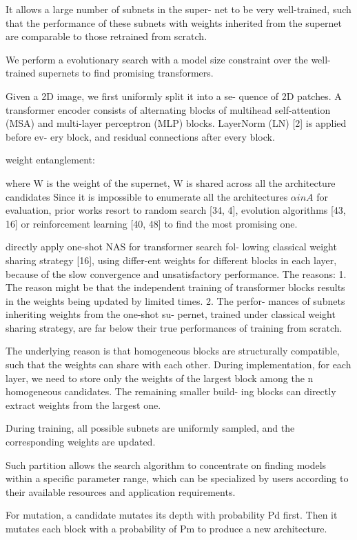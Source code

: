 \documentclass[UTF8]{article}
\begin{document}
It allows a large number of subnets in the super- net to be very well-trained, such that the performance of these subnets with weights inherited from the supernet are comparable to those retrained from scratch.

We perform a evolutionary search with a model size constraint over the well-trained supernets to find promising transformers.

Given a 2D image, we first uniformly split it into a se- quence of 2D patches. A transformer encoder consists of alternating blocks of multihead self-attention (MSA) and multi-layer perceptron (MLP) blocks. LayerNorm (LN) [2] is applied before ev- ery block, and residual connections after every block.

weight entanglement:

where W is the weight of the supernet, W is shared across all the architecture candidates
Since it is impossible to enumerate all the architectures $\alpha in A$ for evaluation, prior works resort to random search [34, 4], evolution algorithms [43, 16] or reinforcement learning [40, 48] to find the most promising one.

directly apply one-shot NAS for transformer search fol- lowing classical weight sharing strategy [16], using differ-ent weights for different blocks in each layer, because of the slow convergence and unsatisfactory performance. The reasons: 1. The reason might be that the independent training of transformer blocks results in the weights being updated by limited times. 2. The perfor- mances of subnets inheriting weights from the one-shot su- pernet, trained under classical weight sharing strategy, are far below their true performances of training from scratch. 

The underlying reason is that homogeneous blocks are structurally compatible, such that the weights can share with each other. During implementation, for each layer, we need to store only the weights of the largest block among the n homogeneous candidates. The remaining smaller build- ing blocks can directly extract weights from the largest one.

During training, all possible subnets are uniformly sampled, and the corresponding weights are updated.

Such partition allows the search algorithm to concentrate on finding models within a specific parameter range, which can be specialized by users according to their available resources and application requirements.

For mutation, a candidate mutates its depth with probability Pd first. Then it mutates each block with a probability of Pm to produce a new architecture.
\end{document}
